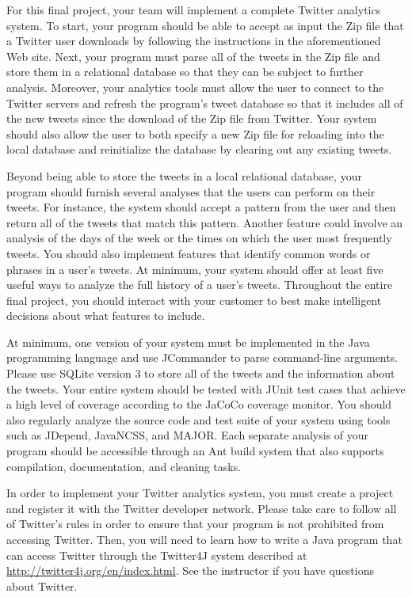 For this final project, your team will implement a complete Twitter analytics system.  To start, your program should be
able to accept as input the Zip file that a Twitter user downloads by following the instructions in the aforementioned
Web site. Next, your program must parse all of the tweets in the Zip file and store them in a relational database so
that they can be subject to further analysis. Moreover, your analytics tools must allow the user to connect to the
Twitter servers and refresh the program's tweet database so that it includes all of the new tweets since the download of
the Zip file from Twitter. Your system should also allow the user to both specify a new Zip file for reloading into the
local database and reinitialize the database by clearing out any existing tweets.

Beyond being able to store the tweets in a local relational database, your program should furnish several analyses that
the users can perform on their tweets.  For instance, the system should accept a pattern from the user and then return
all of the tweets that match this pattern.  Another feature could involve an analysis of the days of the week or the
times on which the user most frequently tweets.  You should also implement features that identify common words or
phrases in a user's tweets. At minimum, your system should offer at least five useful ways to analyze the full history
of a user's tweets.  Throughout the entire final project, you should interact with your customer to best make
intelligent decisions about what features to include.

At minimum, one version of your system must be implemented in the Java programming language and use JCommander to parse
command-line arguments. Please use SQLite version 3 to store all of the tweets and the information about the tweets.
Your entire system should be tested with JUnit test cases that achieve a high level of coverage according to the JaCoCo
coverage monitor.  You should also regularly analyze the source code and test suite of your system using tools such as
JDepend, JavaNCSS, and MAJOR. Each separate analysis of your program should be accessible through an Ant build system
that also supports compilation, documentation, and cleaning tasks.

In order to implement your Twitter analytics system, you must create a project and register it with the Twitter
developer network.  Please take care to follow all of Twitter's rules in order to ensure that your program is not
prohibited from accessing Twitter. Then, you will need to learn how to write a Java program that can access Twitter
through the Twitter4J system described at \url{http://twitter4j.org/en/index.html}.  See the instructor if you
have questions about Twitter.

